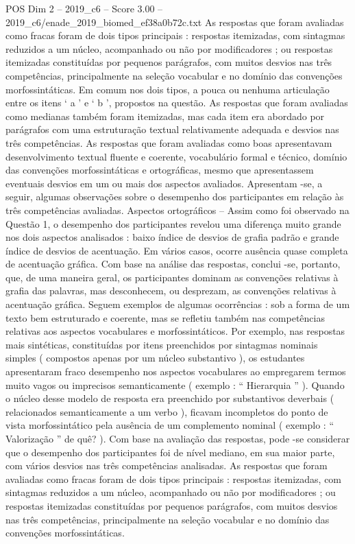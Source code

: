 \begin{textsample}{POS Dim 2 – 2019\_c6 – Score 3.00 – 2019\_c6/enade\_2019\_biomed\_ef38a0b72c.txt}
As respostas que foram avaliadas como fracas foram de dois tipos principais : respostas itemizadas, com sintagmas reduzidos a um núcleo, acompanhado ou não por modificadores ; ou respostas itemizadas constituídas por pequenos parágrafos, com muitos desvios nas três competências, principalmente na seleção vocabular e no domínio das convenções morfossintáticas.
Em comum nos dois tipos, a pouca ou nenhuma articulação entre os itens ‘ a ’ e ‘ b ’, propostos na questão.
As respostas que foram avaliadas como medianas também foram itemizadas, mas cada item era abordado por parágrafos com uma estruturação textual relativamente adequada e desvios nas três competências.
As respostas que foram avaliadas como boas apresentavam desenvolvimento textual fluente e coerente, vocabulário formal e técnico, domínio das convenções morfossintáticas e ortográficas, mesmo que apresentassem eventuais desvios em um ou mais dos aspectos avaliados.
Apresentam -se, a seguir, algumas observações sobre o desempenho dos participantes em relação às três competências avaliadas.
Aspectos ortográficos – Assim como foi observado na Questão 1, o desempenho dos participantes revelou uma diferença muito grande nos dois aspectos analisados : baixo índice de desvios de grafia padrão e grande índice de desvios de acentuação.
Em vários casos, ocorre ausência quase completa de acentuação gráfica.
Com base na análise das respostas, conclui -se, portanto, que, de uma maneira geral, os participantes dominam as convenções relativas à grafia das palavras, mas desconhecem, ou desprezam, as convenções relativas à acentuação gráfica.
Seguem exemplos de algumas ocorrências : sob a forma de um texto bem estruturado e coerente, mas se refletiu também nas competências relativas aos aspectos vocabulares e morfossintáticos.
Por exemplo, nas respostas mais sintéticas, constituídas por itens preenchidos por sintagmas nominais simples ( compostos apenas por um núcleo substantivo ), os estudantes apresentaram fraco desempenho nos aspectos vocabulares ao empregarem termos muito vagos ou imprecisos semanticamente ( exemplo : “ Hierarquia ” ).
Quando o núcleo desse modelo de resposta era preenchido por substantivos deverbais ( relacionados semanticamente a um verbo ), ficavam incompletos do ponto de vista morfossintático pela ausência de um complemento nominal ( exemplo : “ Valorização ” de quê? ).
Com base na avaliação das respostas, pode -se considerar que o desempenho dos participantes foi de nível mediano, em sua maior parte, com vários desvios nas três competências analisadas.
As respostas que foram avaliadas como fracas foram de dois tipos principais : respostas itemizadas, com sintagmas reduzidos a um núcleo, acompanhado ou não por modificadores ; ou respostas itemizadas constituídas por pequenos parágrafos, com muitos desvios nas três competências, principalmente na seleção vocabular e no domínio das convenções morfossintáticas.

\end{textsample}
